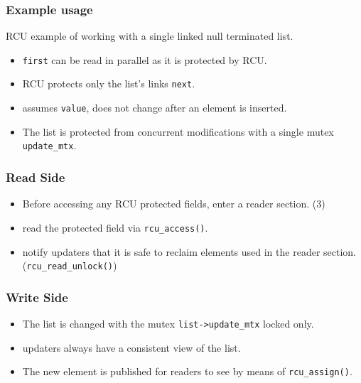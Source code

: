 \documentclass{beamer}
\begin{document}
\begin{frame}[t]
  \frametitle{Example usage}

  RCU example of working with a single linked null terminated list.
  
  

  \begin{itemize}
  \item \texttt{first} can be read in parallel as it is protected by RCU.
  \item RCU protects only the list’s links \texttt{next}.
  \item assumes \texttt{value}, does not change after an element is inserted.
  \item The list is protected from concurrent modifications with a single mutex
    \texttt{update\_mtx}.
  \end{itemize}

\end{frame}


\begin{frame}[t]
  \frametitle{Read Side}

  

  \begin{itemize}
  \item Before accessing any RCU protected fields, enter a reader section. (3)
  \item read the protected field via \texttt{rcu\_access()}.
  \item notify updaters that it is safe to reclaim elements used in
    the reader section. (\texttt{rcu\_read\_unlock()})
  \end{itemize}
  
\end{frame}


\begin{frame}[t]
  \frametitle{Write Side}

  

  \begin{itemize}
  \item The list is changed with the mutex \texttt{list->update\_mtx} locked only.
  \item updaters always have a consistent view of the list.
  \item The new element is published for readers to see by means of \texttt{rcu\_assign()}.
  \end{itemize}
  
\end{frame}
\end{document}
